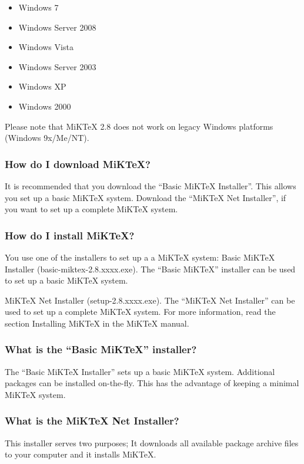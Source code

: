 \begin{itemize}
\item Windows 7
\item Windows Server 2008
\item Windows Vista
\item Windows Server 2003
\item Windows XP
\item Windows 2000
\end{itemize}

Please note that MiKTeX 2.8 does not work on legacy Windows platforms (Windows 9x/Me/NT).

\subsubsection{How do I download MiKTeX?}	

It is recommended that you download the “Basic MiKTeX Installer”. This allows you set up a basic MiKTeX system. Download the “MiKTeX Net Installer”, if you want to set up a complete MiKTeX system.

\subsubsection{How do I install MiKTeX?}	

You use one of the installers to set up a a MiKTeX system: Basic MiKTeX Installer (basic-miktex-2.8.xxxx.exe). The “Basic MiKTeX” installer can be used to set up a basic MiKTeX system.

MiKTeX Net Installer (setup-2.8.xxxx.exe). The “MiKTeX Net Installer” can be used to set up a complete MiKTeX system. For more information, read the section Installing MiKTeX in the MiKTeX manual.

\subsubsection{What is the “Basic MiKTeX” installer?}	

The “Basic MiKTeX Installer” sets up a basic MiKTeX system. Additional packages can be installed on-the-fly. This has the advantage of keeping a minimal MiKTeX system.	

\subsubsection{What is the MiKTeX Net Installer?}	

This installer serves two purposes; It downloads all available package archive files to your computer and it installs MiKTeX.

